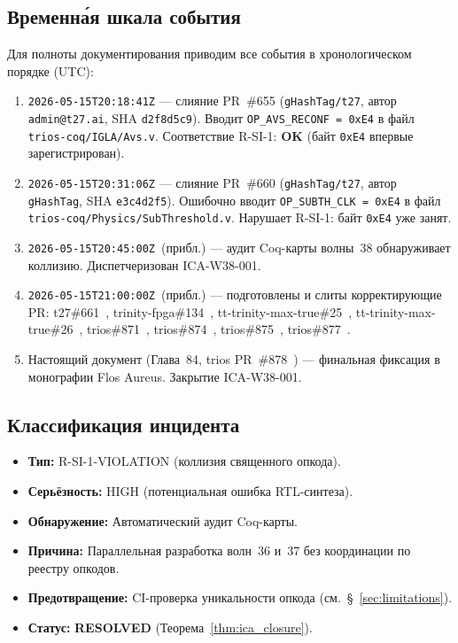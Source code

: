 
\subsection{Временна́я шкала события}

Для полноты документирования приводим все события в хронологическом
порядке (UTC):

\begin{enumerate}
  \item \texttt{2026-05-15T20:18:41Z} — слияние PR~\#655
    (\texttt{gHashTag/t27}, автор \texttt{admin@t27.ai},
    SHA \texttt{d2f8d5c9}).  Вводит \texttt{OP\_AVS\_RECONF = 0xE4}
    в файл \texttt{trios-coq/IGLA/Avs.v}.  Соответствие R-SI-1:
    \textbf{OK} (байт \texttt{0xE4} впервые зарегистрирован).

  \item \texttt{2026-05-15T20:31:06Z} — слияние PR~\#660
    (\texttt{gHashTag/t27}, автор \texttt{gHashTag},
    SHA \texttt{e3c4d2f5}).  Ошибочно вводит
    \texttt{OP\_SUBTH\_CLK = 0xE4} в файл
    \texttt{trios-coq/Physics/SubThreshold.v}.
    Нарушает R-SI-1: байт \texttt{0xE4} уже занят.

  \item \texttt{2026-05-15T20:45:00Z}~(прибл.) —
    аудит Coq-карты волны~38 обнаруживает коллизию.
    Диспетчеризован ICA-W38-001.

  \item \texttt{2026-05-15T21:00:00Z}~(прибл.) —
    подготовлены и слиты корректирующие PR:
    t27\#661~\cite{pr661_t27},
    trinity-fpga\#134~\cite{pr_trinity_fpga_134},
    tt-trinity-max-true\#25~\cite{pr_tt25},
    tt-trinity-max-true\#26~\cite{pr_tt26},
    trios\#871~\cite{pr_trios_871},
    trios\#874~\cite{pr_trios_874},
    trios\#875~\cite{pr_trios_875},
    trios\#877~\cite{pr_trios_877}.

  \item Настоящий документ (Глава~84,
    trios PR~\#878~\cite{pr_trios_877}) — финальная фиксация
    в монографии Flos Aureus. Закрытие ICA-W38-001.
\end{enumerate}

\subsection{Классификация инцидента}

\begin{itemize}
  \item \textbf{Тип:} R-SI-1-VIOLATION (коллизия священного опкода).
  \item \textbf{Серьёзность:} HIGH (потенциальная ошибка RTL-синтеза).
  \item \textbf{Обнаружение:} Автоматический аудит Coq-карты.
  \item \textbf{Причина:} Параллельная разработка волн~36 и~37
    без координации по реестру опкодов.
  \item \textbf{Предотвращение:} CI-проверка уникальности опкода
    (см.\ §~\ref{sec:limitations}).
  \item \textbf{Статус:} \textbf{RESOLVED} (Теорема~\ref{thm:ica_closure}).
\end{itemize}

